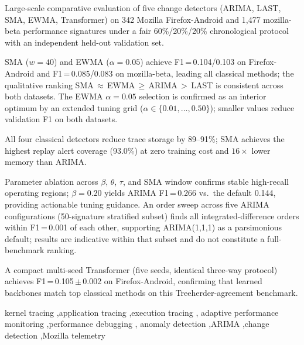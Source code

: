 \documentclass[a4paper,fleqn]{cas-sc}
\theoremstyle{plain}
\begin{document}
\begin{highlights}
\item Large-scale comparative evaluation of five change detectors (ARIMA, LAST,
SMA, EWMA, Transformer) on 342 Mozilla Firefox-Android and 1{,}477 mozilla-beta
performance signatures under a fair 60\%/20\%/20\% chronological protocol with
an independent held-out validation set.
\item SMA ($w\!=\!40$) and EWMA ($\alpha\!=\!0.05$) achieve F1\,=\,0.104/0.103
on Firefox-Android and F1\,=\,0.085/0.083 on mozilla-beta, leading all classical
methods; the qualitative ranking
SMA\,$\approx$\,EWMA\,$\geq$\,ARIMA\,$>$\,LAST is consistent across both
datasets.
The EWMA $\alpha=0.05$ selection is confirmed as an interior optimum by
an extended tuning grid ($\alpha \in \{0.01,\ldots,0.50\}$); smaller
values reduce validation F1 on both datasets.
\item All four classical detectors reduce trace storage by 89--91\%; SMA achieves
the highest replay alert coverage (93.0\%) at zero training cost and $16\times$
lower memory than ARIMA.
\item Parameter ablation across $\beta$, $\theta$, $\tau$, and SMA window
confirms stable high-recall operating regions; $\beta\!=\!0.20$ yields
ARIMA F1\,=\,0.266 vs.\ the default 0.144, providing actionable tuning guidance.
An order sweep across five ARIMA configurations (50-signature stratified subset)
finds all integrated-difference orders within F1\,=\,0.001 of each other,
supporting ARIMA(1,1,1) as a parsimonious default; results are indicative
within that subset and do not constitute a full-benchmark ranking.
\item A compact multi-seed Transformer (five seeds, identical three-way protocol)
achieves F1\,=\,0.105\,$\pm$\,0.002 on Firefox-Android, confirming that learned
backbones match top classical methods on this Treeherder-agreement benchmark.
\end{highlights}

\begin{keywords}
kernel tracing \sep application tracing \sep execution tracing \sep
adaptive performance monitoring \sep performance debugging \sep
anomaly detection \sep ARIMA \sep change detection \sep Mozilla telemetry
\end{keywords}

\maketitle
\end{document}
